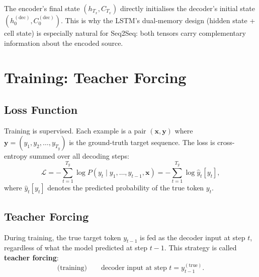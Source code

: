 \documentclass[12pt,a4paper]{article}
\begin{document}
\begin{keyinsight}
  The encoder's final state $(h_{T_x}, C_{T_x})$ directly initialises the decoder's initial
  state $(h_0^{(\text{dec})}, C_0^{(\text{dec})})$. This is why the LSTM's dual-memory design
  (hidden state + cell state) is especially natural for Seq2Seq: both tensors carry complementary
  information about the encoded source.
\end{keyinsight}

\section{Training: Teacher Forcing}
\label{sec:training}

\subsection{Loss Function}

Training is supervised. Each example is a pair $(\mathbf{x}, \mathbf{y})$ where $\mathbf{y} =
(y_1, y_2, \ldots, y_{T_y})$ is the ground-truth target sequence. The loss is cross-entropy
summed over all decoding steps:
\begin{equation}
  \mathcal{L} = -\sum_{t=1}^{T_y} \log P\!\left(y_t \mid y_1, \ldots, y_{t-1}, \mathbf{x}\right)
              = -\sum_{t=1}^{T_y} \log \hat{y}_t[y_t],
  \label{eq:seq2seq_loss}
\end{equation}
where $\hat{y}_t[y_t]$ denotes the predicted probability of the true token $y_t$.

\subsection{Teacher Forcing}

During training, the true target token $y_{t-1}$ is fed as the decoder input at step $t$,
regardless of what the model predicted at step $t-1$. This strategy is called \textbf{teacher
forcing}:
\begin{equation}
  \text{(training)}\qquad \text{decoder input at step }t = y_{t-1}^{(\text{true})}.
  \label{eq:teacher_forcing}
\end{equation}
\end{document}
